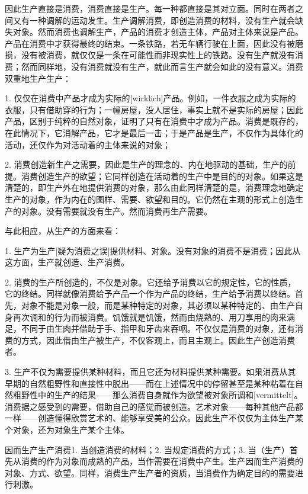 \documentclass[a4paper,twoside,12pt]{ctexart}
\begin{document}
因此生产直接是消费，消费直接是生产。每一种都直接是其对立面。同时在两者之间又有一种调解的运动发生。生产调解消费，即创造消费的材料，没有生产就会缺失对象。然而消费也调解生产，产品的消费才创造主体，产品对主体来说是产品。产品在消费中才获得最终的结束。一条铁路，若无车辆行驶在上面，因此没有被磨损，没有被消费，就仅仅是一条在可能性而非现实性上的铁路。没有生产就没有消费；然而同样地，没有消费就没有生产，就此而言生产就会如此的没有意义。消费双重地生产生产：

1. 仅仅在消费中产品才成为实际的[wirklich]产品。例如，一件衣服之成为实际的衣服，只有借助穿的行为；一幢房屋，没人居住，事实上就不是实际的房屋；因此产品，区别于纯粹的自然对象，证明了只有在消费中才成为产品。消费是既存的，在此情况下，它消解产品，它才是最后一击；于是产品是生产，不仅作为具体化的活动，还仅作为对活动着的主体来说的对象；

2. 消费创造新生产之需要，因此是生产的理念的、内在地驱动的基础，生产的前提。消费创造生产的欲望；它同样创造在活动着的生产中是目的的对象。如果这是清楚的，即生产外在地提供消费的对象，那么由此同样清楚的是，消费理念地确定生产的对象，作为内在的图样、需要、欲望和目的。它仍然在主观的形式上创造生产的对象。没有需要就没有生产。然而消费再生产需要。

与此相应，从生产的方面来看：

1. 生产为生产[疑为消费之误]提供材料、对象。没有对象的消费不是消费；因此从这方面，生产就创造、生产消费。

2. 消费的生产所创造的，不仅是对象。它还给予消费以它的规定性，它的性质，它的终结。同样就像消费给予产品一个作为产品的终结，生产给予消费以终结。首先，对象不能是对象一般，而是某种特定的对象，其必须以某种特定的、由生产自身再次调和的行为而被消费。饥饿就是饥饿，然而由烧熟的、用刀享用的肉来满足，不同于由生肉并借助于手、指甲和牙齿来吞咽。不仅仅是消费的对象，还有消费的方式，因此借由生产被生产，不仅客观上，而且主观上。因此生产创造消费者。

3. 生产不仅为需要提供某种材料，而且它还为材料提供某种需要。如果消费从其早期的自然粗野性和直接性中脱出——而在上述情况中的停留甚至是某种粘着在自然粗野性中的生产的结果——那么消费自身就作为欲望被对象所调和[vermittelt]。消费据之感受到的需要，借助自己的感觉而被创造。艺术对象——每种其他产品都一样——创造懂得欣赏艺术的、能够享受美的公众。因此生产不仅仅为主体生产某个对象，还为对象生产某个主体。

因而生产生产消费1. 当创造消费的材料；2. 当规定消费的方式；3. 当（生产）首先从消费的作为对象而成熟的产品，当作需要在消费中产生。生产因而生产消费的对象、方式、欲望。同样，消费生产生产者的资质，当消费作为确定目的的需要进行刺激。
\end{document}
